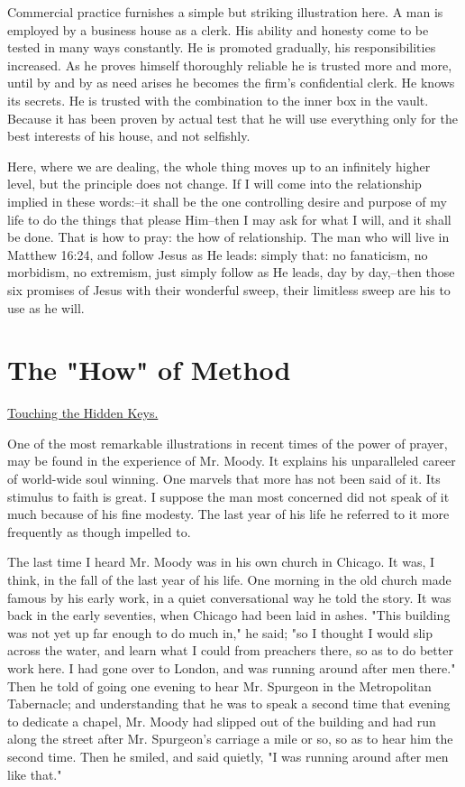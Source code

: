 Commercial practice furnishes a simple but striking illustration here. A
man is employed by a business house as a clerk. His ability and honesty
come to be tested in many ways constantly. He is promoted gradually, his
responsibilities increased. As he proves himself thoroughly reliable he is
trusted more and more, until by and by as need arises he becomes the
firm's confidential clerk. He knows its secrets. He is trusted with the
combination to the inner box in the vault. Because it has been proven by
actual test that he will use everything only for the best interests of his
house, and not selfishly.

Here, where we are dealing, the whole thing moves up to an infinitely
higher level, but the principle does not change. If I will come into the
relationship implied in these words:--it shall be the one controlling
desire and purpose of my life to do the things that please Him--then I may
ask for what I will, and it shall be done. That is how to pray: the how of
relationship. The man who will live in Matthew 16:24, and follow Jesus as
He leads: simply that: no fanaticism, no morbidism, no extremism, just
simply follow as He leads, day by day,--then those six promises of Jesus
with their wonderful sweep, their limitless sweep are his to use as he
will.




\chapter{The "How" of Method}



\underline{Touching the Hidden Keys.}


One of the most remarkable illustrations in recent times of the power of
prayer, may be found in the experience of Mr. Moody. It explains his
unparalleled career of world-wide soul winning. One marvels that more has
not been said of it. Its stimulus to faith is great. I suppose the man
most concerned did not speak of it much because of his fine modesty. The
last year of his life he referred to it more frequently as though impelled
to.

The last time I heard Mr. Moody was in his own church in Chicago. It was,
I think, in the fall of the last year of his life. One morning in the old
church made famous by his early work, in a quiet conversational way he
told the story. It was back in the early seventies, when Chicago had been
laid in ashes. "This building was not yet up far enough to do much in," he
said; "so I thought I would slip across the water, and learn what I could
from preachers there, so as to do better work here. I had gone over to
London, and was running around after men there." Then he told of going
one evening to hear Mr. Spurgeon in the Metropolitan Tabernacle; and
understanding that he was to speak a second time that evening to dedicate
a chapel, Mr. Moody had slipped out of the building and had run along the
street after Mr. Spurgeon's carriage a mile or so, so as to hear him the
second time. Then he smiled, and said quietly, "I was running around after
men like that."

